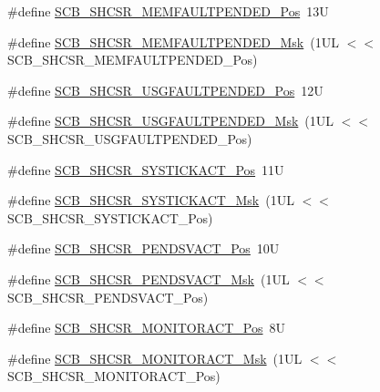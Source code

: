 \begin{DoxyCompactItemize}
\item 
\#define \mbox{\hyperlink{group___c_m_s_i_s___s_c_b_gaceb60fe2d8a8cb17fcd1c1f6b5aa924f}{S\+C\+B\+\_\+\+S\+H\+C\+S\+R\+\_\+\+M\+E\+M\+F\+A\+U\+L\+T\+P\+E\+N\+D\+E\+D\+\_\+\+Pos}}~13U
\item 
\#define \mbox{\hyperlink{group___c_m_s_i_s___s_c_b_ga9abc6c2e395f9e5af4ce05fc420fb04c}{S\+C\+B\+\_\+\+S\+H\+C\+S\+R\+\_\+\+M\+E\+M\+F\+A\+U\+L\+T\+P\+E\+N\+D\+E\+D\+\_\+\+Msk}}~(1\+U\+L $<$$<$ S\+C\+B\+\_\+\+S\+H\+C\+S\+R\+\_\+\+M\+E\+M\+F\+A\+U\+L\+T\+P\+E\+N\+D\+E\+D\+\_\+\+Pos)
\item 
\#define \mbox{\hyperlink{group___c_m_s_i_s___s_c_b_ga3cf03acf1fdc2edc3b047ddd47ebbf87}{S\+C\+B\+\_\+\+S\+H\+C\+S\+R\+\_\+\+U\+S\+G\+F\+A\+U\+L\+T\+P\+E\+N\+D\+E\+D\+\_\+\+Pos}}~12U
\item 
\#define \mbox{\hyperlink{group___c_m_s_i_s___s_c_b_ga122b4f732732010895e438803a29d3cc}{S\+C\+B\+\_\+\+S\+H\+C\+S\+R\+\_\+\+U\+S\+G\+F\+A\+U\+L\+T\+P\+E\+N\+D\+E\+D\+\_\+\+Msk}}~(1\+U\+L $<$$<$ S\+C\+B\+\_\+\+S\+H\+C\+S\+R\+\_\+\+U\+S\+G\+F\+A\+U\+L\+T\+P\+E\+N\+D\+E\+D\+\_\+\+Pos)
\item 
\#define \mbox{\hyperlink{group___c_m_s_i_s___s_c_b_gaec9ca3b1213c49e2442373445e1697de}{S\+C\+B\+\_\+\+S\+H\+C\+S\+R\+\_\+\+S\+Y\+S\+T\+I\+C\+K\+A\+C\+T\+\_\+\+Pos}}~11U
\item 
\#define \mbox{\hyperlink{group___c_m_s_i_s___s_c_b_gafef530088dc6d6bfc9f1893d52853684}{S\+C\+B\+\_\+\+S\+H\+C\+S\+R\+\_\+\+S\+Y\+S\+T\+I\+C\+K\+A\+C\+T\+\_\+\+Msk}}~(1\+U\+L $<$$<$ S\+C\+B\+\_\+\+S\+H\+C\+S\+R\+\_\+\+S\+Y\+S\+T\+I\+C\+K\+A\+C\+T\+\_\+\+Pos)
\item 
\#define \mbox{\hyperlink{group___c_m_s_i_s___s_c_b_ga9b9fa69ce4c5ce7fe0861dbccfb15939}{S\+C\+B\+\_\+\+S\+H\+C\+S\+R\+\_\+\+P\+E\+N\+D\+S\+V\+A\+C\+T\+\_\+\+Pos}}~10U
\item 
\#define \mbox{\hyperlink{group___c_m_s_i_s___s_c_b_gae0e837241a515d4cbadaaae1faa8e039}{S\+C\+B\+\_\+\+S\+H\+C\+S\+R\+\_\+\+P\+E\+N\+D\+S\+V\+A\+C\+T\+\_\+\+Msk}}~(1\+U\+L $<$$<$ S\+C\+B\+\_\+\+S\+H\+C\+S\+R\+\_\+\+P\+E\+N\+D\+S\+V\+A\+C\+T\+\_\+\+Pos)
\item 
\#define \mbox{\hyperlink{group___c_m_s_i_s___s_c_b_ga8b71cf4c61803752a41c96deb00d26af}{S\+C\+B\+\_\+\+S\+H\+C\+S\+R\+\_\+\+M\+O\+N\+I\+T\+O\+R\+A\+C\+T\+\_\+\+Pos}}~8U
\item 
\#define \mbox{\hyperlink{group___c_m_s_i_s___s_c_b_gaad09b4bc36e9bccccc2e110d20b16e1a}{S\+C\+B\+\_\+\+S\+H\+C\+S\+R\+\_\+\+M\+O\+N\+I\+T\+O\+R\+A\+C\+T\+\_\+\+Msk}}~(1\+U\+L $<$$<$ S\+C\+B\+\_\+\+S\+H\+C\+S\+R\+\_\+\+M\+O\+N\+I\+T\+O\+R\+A\+C\+T\+\_\+\+Pos)
$$
\end{DoxyCompactItemize}
